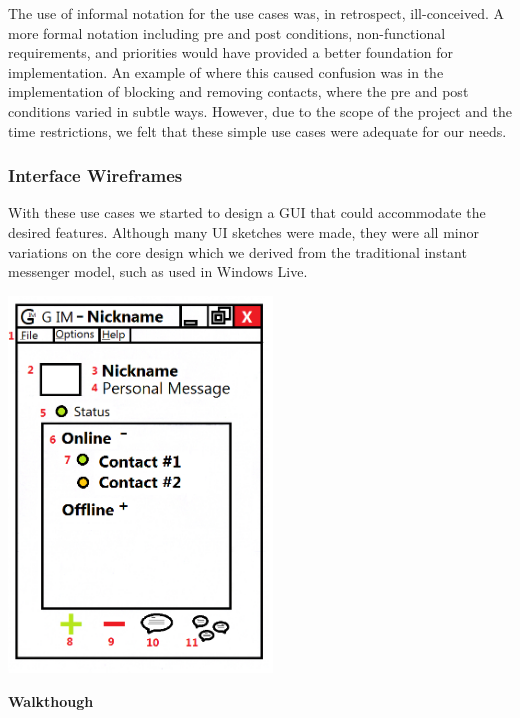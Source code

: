 The use of informal notation for the use cases was, in retrospect, ill-conceived. A more formal notation including pre and post conditions, non-functional requirements, and priorities would have provided a better foundation for implementation. An example of where this caused confusion was in the implementation of blocking and removing contacts, where the pre and post conditions varied in subtle ways. However, due to the scope of the project and the time restrictions, we felt that these simple use cases were adequate for our needs.

\subsubsection{Interface Wireframes}

With these use cases we started to design a GUI that could accommodate the desired features. Although many UI sketches were made, they were all minor variations on the core design which we derived from the traditional instant messenger model, such as used in Windows Live.

\includegraphics[width=7cm]{Design/diagrams/Main_UI.png}

{\bf Walkthough}

